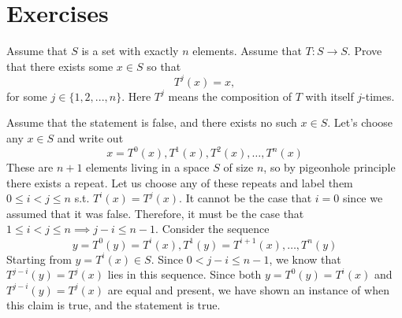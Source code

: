 \section{Exercises}

  \begin{exercise}
    Assume that $S$ is a set with exactly $n$ elements. Assume that $T : S \to S$.
    Prove that there exists some $x \in S$ so that
    \begin{equation}
      T^j(x) = x,
    \end{equation}
    for some $j \in \{1,2,...,n\}$. Here $T^j$ means the composition of $T$ with itself
    $j$-times.
  \end{exercise}
  \begin{solution}
    Assume that the statement is false, and there exists no such $x \in S$. Let's choose any $x \in S$ and write out 
    \begin{equation}
      x = T^0 (x) , T^1 (x), T^2 (x), \ldots, T^n (x)
    \end{equation}
    These are $n+1$ elements living in a space $S$ of size $n$, so by pigeonhole principle there exists a repeat. Let us choose any of these repeats and label them $0 \leq i < j \leq n$ s.t. $T^i (x) = T^j (x)$. It cannot be the case that $i = 0$ since we assumed that it was false. Therefore, it must be the case that $1 \leq i < j \leq n \implies j - i \leq n-1$. Consider the sequence 
    \begin{equation}
      y = T^0 (y) = T^i (x), T^1 (y) = T^{i+1} (x), \ldots, T^n (y)
    \end{equation}
    Starting from $y = T^i (x) \in S$. Since $0 < j - i \leq n - 1$, we know that $T^{j-i} (y) = T^j (x)$ lies in this sequence. Since both $y = T^0 (y) = T^i (x)$ and $T^{j-i} (y) = T^j (x)$ are equal and present, we have shown an instance of when this claim is true, and the statement is true. 
  \end{solution}

